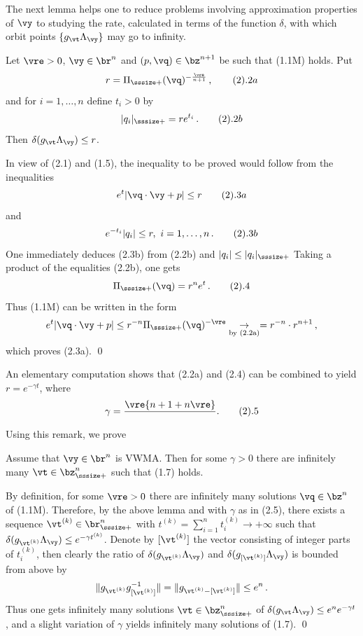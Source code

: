 The next lemma helps one to reduce problems involving approximation properties of $\vy$ to studying the rate, calculated in terms of the function $\delta$, with which orbit points $\{g_\vt\Lambda_\vy\}$ may go to infinity.%


 Let $\vre > 0$, $\vy\in\br^{n}$ and $(p,\vq)\in\bz^{n+1}$ be such that {\rm (1.1M)} holds. Put 
$$
r = \Pi_{\sssize +}(\vq)^{-\frac{\vre}{n+1}}\,,\tag 2.2a
$$
 and for $i = 1,\dots,n$ define  $t_i> 0$ by 
$$
|q_i|_{\sssize +} = r e^{t_i}\,.\tag 2.2b
$$
Then 
$
\delta(g_\vt\Lambda_\vy) \le r
$.
\endproclaim

 In view of (2.1) and (1.5), the inequality to be proved
would follow from the inequalities
$$
  e^{t}|\vq\cdot\vy + p| \le r\tag 2.3a
$$
and
$$
e^{-t_i}|q_i|\le r,\ i = 1,\dots,n\,.\tag 2.3b
$$
One immediately deduces (2.3b) from (2.2b) and $|q_i|\le
|q_i|_{\sssize +}$ Taking a product of the equalities (2.2b), one gets  
$$
\Pi_{\sssize +}(\vq) = r^ne^{t}\,.\tag 2.4
$$
Thus (1.1M) can be written in the form
$$ 
 e^{t}|\vq\cdot\vy + p| \le r^{-n}\Pi_{\sssize +}(\vq)^{-\vre} \underset{\text{by (2.2a)}}\to =  r^{-n}\cdot r^{n+1}\,,
$$
which proves (2.3a).
 \qed
\enddemo

An elementary computation shows  that (2.2a) and (2.4) can be combined to yield
$r = e^{-\gamma t}$, where  
$$
\gamma = \frac\vre{n + 1 + n\vre}\,.\tag 2.5 
$$
Using this remark, we prove

 Assume that $\vy\in\br^n$ is VWMA. Then  
  for some $\gamma > 0$ there are infinitely many 
$\vt\in\bz_{\sssize +}^n$ such that {\rm (1.7)} holds.
\endproclaim


 By definition, for some $\vre> 0$ there are infinitely many solutions $\vq\in\bz^n$ of (1.1M). Therefore, by the above lemma and with $\gamma$ as in (2.5), there exists a sequence $\vt^{(k)}\in\br_{\sssize +}^n$ with $t^{(k)} = \sum_{i = 1}^nt_i^{(k)}\to + \infty$ such that $
\delta(g_{\vt^{(k)}}\Lambda_\vy) \le e^{-\gamma t^{(k)}}
$. \linebreak Denote by $[\vt^{(k)}]$ the vector consisting of  integer parts of $t_i^{(k)}$, then clearly the ratio of $\delta(g_{\vt^{(k)}}\Lambda_\vy)$ and $\delta(g_{[\vt^{(k)}]}\Lambda_\vy)$ is bounded from above by $$
\|g_{\vt^{(k)}}g^{-1}_{[\vt^{(k)}]}\| = \|g_{\vt^{(k)} - [\vt^{(k)}]}\| \le e^n\,.
$$
 Thus one gets  infinitely many solutions $\vt\in\bz_{\sssize +}^n$ of  $
\delta(g_\vt\Lambda_\vy) \le e^ne^{-\gamma t}$, and a slight variation of $\gamma$ yields  infinitely many solutions of (1.7). \qed
\enddemo

